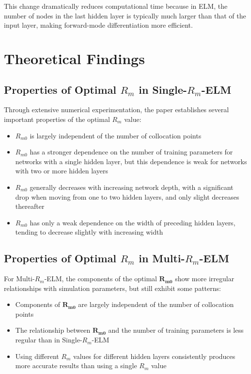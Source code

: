 \documentclass[11pt,a4paper]{article}
\begin{document}
This change dramatically reduces computational time because in ELM, the number of nodes in the last hidden layer is typically much larger than that of the input layer, making forward-mode differentiation more efficient.

\section{Theoretical Findings}

\subsection{Properties of Optimal $R_m$ in Single-$R_m$-ELM}

Through extensive numerical experimentation, the paper establishes several important properties of the optimal $R_m$ value:

\begin{itemize}
    \item $R_{m0}$ is largely independent of the number of collocation points
    \item $R_{m0}$ has a stronger dependence on the number of training parameters for networks with a single hidden layer, but this dependence is weak for networks with two or more hidden layers
    \item $R_{m0}$ generally decreases with increasing network depth, with a significant drop when moving from one to two hidden layers, and only slight decreases thereafter
    \item $R_{m0}$ has only a weak dependence on the width of preceding hidden layers, tending to decrease slightly with increasing width
\end{itemize}

\subsection{Properties of Optimal $R_m$ in Multi-$R_m$-ELM}

For Multi-$R_m$-ELM, the components of the optimal $\mathbf{R_{m0}}$ show more irregular relationships with simulation parameters, but still exhibit some patterns:

\begin{itemize}
    \item Components of $\mathbf{R_{m0}}$ are largely independent of the number of collocation points
    \item The relationship between $\mathbf{R_{m0}}$ and the number of training parameters is less regular than in Single-$R_m$-ELM
    \item Using different $R_m$ values for different hidden layers consistently produces more accurate results than using a single $R_m$ value
\end{itemize}
\end{document}
